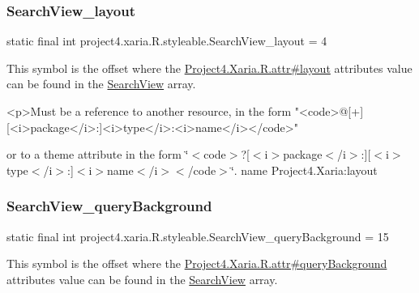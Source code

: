 \subsubsection{\texorpdfstring{Search\+View\+\_\+layout}{SearchView\_layout}}
{\footnotesize\ttfamily static final int project4.\+xaria.\+R.\+styleable.\+Search\+View\+\_\+layout = 4\hspace{0.3cm}{\ttfamily [static]}}

This symbol is the offset where the \hyperlink{}{Project4.\+Xaria.\+R.\+attr\#layout} attribute\textquotesingle{}s value can be found in the \hyperlink{classproject4_1_1xaria_1_1R_1_1styleable_a6308d960f6e1e05e5316efa4904fedfc}{Search\+View} array.

\begin{DoxyVerb}      <p>Must be a reference to another resource, in the form "<code>@[+][<i>package</i>:]<i>type</i>:<i>name</i></code>"
\end{DoxyVerb}
 or to a theme attribute in the form \char`\"{}$<$code$>$?\mbox{[}$<$i$>$package$<$/i$>$\+:\mbox{]}\mbox{[}$<$i$>$type$<$/i$>$\+:\mbox{]}$<$i$>$name$<$/i$>$$<$/code$>$\char`\"{}.  name Project4.\+Xaria\+:layout \mbox{\label{classproject4_1_1xaria_1_1R_1_1styleable_a56c5e64109ae3a3635dabc3c9c16287c}} 
\subsubsection{\texorpdfstring{Search\+View\+\_\+query\+Background}{SearchView\_queryBackground}}
{\footnotesize\ttfamily static final int project4.\+xaria.\+R.\+styleable.\+Search\+View\+\_\+query\+Background = 15\hspace{0.3cm}{\ttfamily [static]}}

This symbol is the offset where the \hyperlink{}{Project4.\+Xaria.\+R.\+attr\#query\+Background} attribute\textquotesingle{}s value can be found in the \hyperlink{classproject4_1_1xaria_1_1R_1_1styleable_a6308d960f6e1e05e5316efa4904fedfc}{Search\+View} array.

